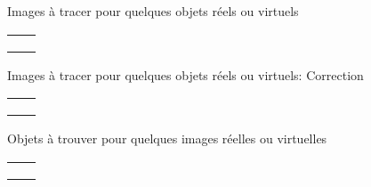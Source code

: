 \documentclass{article}
\newcommand{\titre}[1]{\hfil{\Large #1}}
\begin{document}
\newpage
\setcounter{page}{1}
\titre{Images \`a tracer pour quelques objets r\'eels ou virtuels}
\begin{tabular}{|c|c|}
\hline
&\\ \hline
&\\ \hline
&\\ \hline
&\\ \hline
\end{tabular}


\newpage


\titre{Images \`a tracer pour quelques objets r\'eels ou virtuels: Correction}
\begin{tabular}{|c|c|}
\hline
&\\ \hline
&\\ \hline
&\\ \hline
&\\ \hline
\end{tabular}


\newpage

\titre{Objets \`a trouver pour quelques images r\'eelles ou virtuelles}
\begin{tabular}{|c|c|}
\hline
&\\ \hline
&\\ \hline
&\\ \hline
&\\ \hline
\end{tabular}


\newpage
\end{document}
